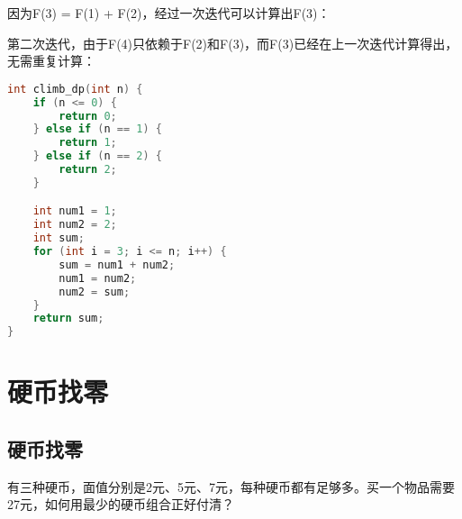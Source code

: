 因为F(3) = F(1) + F(2)，经过一次迭代可以计算出F(3)：

\begin{table}[H]
	\centering
\end{table}

第二次迭代，由于F(4)只依赖于F(2)和F(3)，而F(3)已经在上一次迭代计算得出，无需重复计算：

\begin{table}[H]
	\centering
\end{table}


\begin{lstlisting}[language=C]
int climb_dp(int n) {
	if (n <= 0) {
		return 0;
	} else if (n == 1) {
		return 1;
	} else if (n == 2) {
		return 2;
	}

	int num1 = 1;
	int num2 = 2;
	int sum;
	for (int i = 3; i <= n; i++) {
		sum = num1 + num2;
		num1 = num2;
		num2 = sum;
	}
	return sum;
}
\end{lstlisting}

\newpage

\section{硬币找零}

\subsection{硬币找零}

有三种硬币，面值分别是2元、5元、7元，每种硬币都有足够多。买一个物品需要27元，如何用最少的硬币组合正好付清？\\

